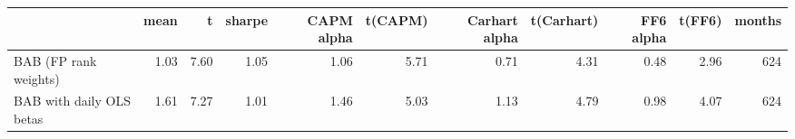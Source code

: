 \begin{tabular}{lrrrrrrrrrr}
\toprule
 & mean & t & sharpe & CAPM alpha & t(CAPM) & Carhart alpha & t(Carhart) & FF6 alpha & t(FF6) & months \\
\midrule
BAB (FP rank weights) & 1.03 & 7.60 & 1.05 & 1.06 & 5.71 & 0.71 & 4.31 & 0.48 & 2.96 & 624 \\
BAB with daily OLS betas & 1.61 & 7.27 & 1.01 & 1.46 & 5.03 & 1.13 & 4.79 & 0.98 & 4.07 & 624 \\
\bottomrule
\end{tabular}
